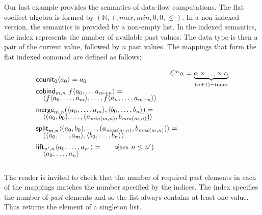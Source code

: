 \begin{example}
Our last example provides the semantics of data-flow computations. The flat coeffect algebra 
is formed by $(\mathbb{N}, +, \mathit{max}, \mathit{min}, 0, 0, \leq)$. In a 
non-indexed version, the semantics is provided by a non-empty list. In the indexed semantics,
the index represents the number of available past values. The data type is then a pair of 
the current value, followed by $n$ past values. The mappings that form the flat indexed comonad 
are defined as follows:

\begin{equation*}
\begin{array}{l}
\ident{counit}_{0}\langle a_0 \rangle = a_0
\\[0.45em]
\ident{cobind}_{m, n}~f \langle a_0, \ldots a_{m+n} \rangle = \\[-0.25em]
\quad \langle f \langle a_0, \ldots, a_m \rangle, \ldots, f \langle a_{n}, \ldots, a_{m+n} \rangle \rangle
\\[0.45em]
\ident{merge}_{m, n} (\langle a_0, \ldots, a_m \rangle, \langle b_0, \ldots, b_n\rangle) = \\[-0.25em]
\quad \langle (a_0, b_0), \ldots, (a_{\mathit{min}(m,n)}, b_{\mathit{min}(m,n)}) \rangle
\\[0.45em]
\ident{split}_{m, n} \langle (a_0, b_0), \ldots, (a_{\mathit{max}(m,n)}, b_{\mathit{max}(m,n)}) \rangle = \\[-0.25em]
\quad (\langle a_0, \ldots, a_m \rangle, \langle b_0, \ldots, b_n\rangle)
\\[0.45em]
\ident{lift}_{n', n} \langle a_0, \ldots, a_{n'} \rangle = \qquad(\hspace{-0.95em}\textnormal{\footnotesize when}~n\leq n') \\[-0.25em]
\quad \langle a_0, \ldots, a_n \rangle
\end{array}
\begin{array}{l}
\hspace{-2em}\ctyp{n}{\alpha} = \underbrace{\alpha \times \ldots \times \alpha}_{(n+1)-\textnormal{times}}\\[11em]
~\\
\end{array}
\end{equation*}
\end{example}

\noindent
The reader is invited to check that the number of required past elements in each of the mappings
matches the number specified by the indices. The index specifies the number of \emph{past} elements
and so the list always contains at least one value. Thus  returns the element of a
singleton list.


